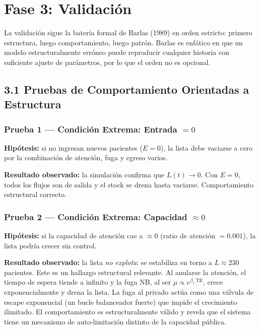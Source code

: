 \documentclass[12pt,a4paper]{article}
\begin{document}
\section*{Fase 3: Validación}

La validación sigue la batería formal de Barlas (1989) en orden estricto: primero estructura, luego comportamiento, luego patrón. Barlas es enfático en que un modelo estructuralmente erróneo puede reproducir cualquier historia con suficiente ajuste de parámetros, por lo que el orden no es opcional.

\subsection*{3.1 Pruebas de Comportamiento Orientadas a Estructura}

\subsubsection*{Prueba 1 — Condición Extrema: Entrada $= 0$}

\textbf{Hipótesis:} si no ingresan nuevos pacientes ($E=0$), la lista debe vaciarse a cero por la combinación de atención, fuga y egreso varios.

\textbf{Resultado observado:} la simulación confirma que $L(t) \to 0$. Con $E=0$, todos los flujos son de salida y el stock se drena hasta vaciarse. Comportamiento estructural correcto.

\subsubsection*{Prueba 2 — Condición Extrema: Capacidad $\approx 0$}

\textbf{Hipótesis:} si la capacidad de atención cae a $\approx 0$ (ratio de atención $=0.001$), la lista podría crecer sin control.

\textbf{Resultado observado:} la lista \emph{no explota}: se estabiliza en torno a $L \approx 230$ pacientes. Este es un hallazgo estructural relevante. Al anularse la atención, el tiempo de espera tiende a infinito y la fuga NB, al ser $\mu \propto e^{\beta_1\,\text{TE}}$, crece exponencialmente y drena la lista. La fuga al privado actúa como una válvula de escape exponencial (un bucle balanceador fuerte) que impide el crecimiento ilimitado. El comportamiento es estructuralmente válido y revela que el sistema tiene un mecanismo de auto-limitación distinto de la capacidad pública.
\end{document}
